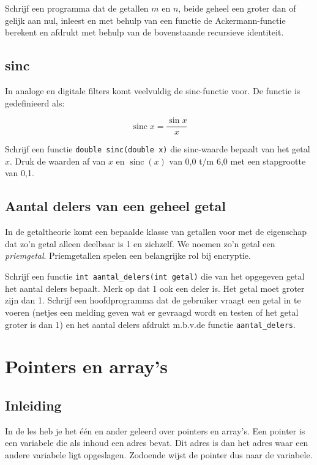 \documentclass[a4paper,10pt,fleqn,twoside]{article}
\DeclareMathOperator{\sinc}{sinc}
\begin{document}
Schrijf een programma dat de getallen $m$ en $n$, beide geheel een groter dan of gelijk aan nul, inleest en met behulp van een functie de Ackermann-functie berekent en afdrukt met behulp van de bovenstaande recursieve identiteit.

\subsection{sinc}
In analoge en digitale filters komt veelvuldig de sinc-functie voor. De functie is gedefinieerd als:

\begin{equation*}
\sinc x= \dfrac{\sin x}{x}
\end{equation*}

Schrijf een functie \lstinline|double sinc(double x)| die sinc-waarde bepaalt van het getal $x$. Druk de waarden af van $x$ en $\sinc(x)$ van 0,0 t/m 6,0 met een stapgrootte van 0,1.

\subsection{Aantal delers van een geheel getal}
In de getaltheorie komt een bepaalde klasse van getallen voor met de eigenschap dat zo'n getal alleen deelbaar is 1 en zichzelf. We noemen zo'n getal een \textsl{priemgetal}. Priemgetallen spelen een belangrijke rol bij encryptie.

Schrijf een functie \lstinline|int aantal_delers(int getal)| die van het opgegeven getal het aantal delers bepaalt. Merk op dat 1 ook een deler is. Het getal moet groter zijn dan 1. Schrijf een hoofdprogramma dat de gebruiker vraagt een getal in te voeren (netjes een melding geven wat er gevraagd wordt en testen of het getal groter is dan 1) en het aantal delers afdrukt m.b.v.\@ de functie \lstinline|aantal_delers|.


\section{Pointers en array's}

\subsection{Inleiding}
\label{sec:inleidingpointers}
In de les heb je het één en ander geleerd over pointers en array’s. Een pointer is een variabele die als inhoud een adres bevat. Dit adres is dan het adres waar een andere variabele ligt opgeslagen. Zodoende wijst de pointer dus naar de variabele.
\end{document}
